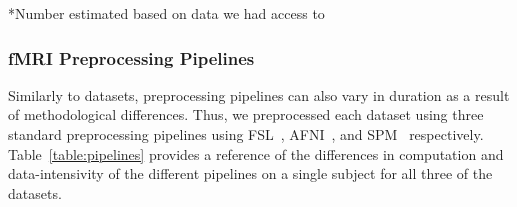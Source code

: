     \begin{table}[t]
      \small\centering
    \footnotesize{*Number estimated based on data we had access to}\\
    \caption{Dataset characteristics. Compressed size is listed as all applications, with the exception of SPM, processed
    compressed data}\label{table:sea-neuro:data}
    \end{table}
    
    
    
    \subsubsection{fMRI Preprocessing Pipelines}
    
    Similarly to datasets, preprocessing pipelines can also vary in duration as a result of methodological differences.
    Thus, we preprocessed each dataset using three standard preprocessing pipelines using FSL~\cite{fsl}, AFNI~\cite{cox1996afni}, and
    SPM~\cite{spm} respectively. Table~\ref{table:pipelines} provides a reference of the differences in computation and data-intensivity
    of the different pipelines on a single subject for all three of the datasets.
    
